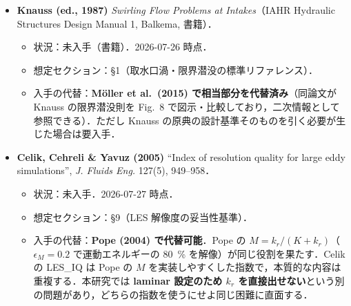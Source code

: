 \documentclass[11pt]{jsarticle}
\begin{document}
\begin{itemize}
\begin{itemize}
    \item \textbf{残る穴（2026-07-26 に一部解消）}：\texttt{discussion.tex} の看板主張のうち「理想シンクは渦度供給源をもたない」の部分は Imberger et al.\ (1976) で引けるようになった（§1，浮力・分布シンクの極限としての言明）．\textbf{未解決なのは「実際の吸込み流が距離とともにどう減衰し，鉛直方向にどんな構造をもつか」}の側で，49 本にこれを扱う文献がない（M\"uller の「吸込みは局所的」は深い系の話で，本論文が対比の相手にしているため支えにならない）．
    \item 入手の代替：大学図書館の電子書籍/OPAC．噴流側は Dracos (1992)・Giger (1991) で代替できるが\textbf{吸込み側の減衰構造の代替は現時点でない}．なお Imberger (1980) ``Selective withdrawal: a review'' は\textbf{成層取水の枠組みなので均質流体の本研究には届かない}（Imberger et al.\ 1976 のメモ参照）．主張(a)を厚くするだけなら流体力学の教科書（Batchelor, Lamb 等）のポテンシャルシンクで足りる．
  \end{itemize}
  \item \textbf{Knauss (ed., 1987)} \textit{Swirling Flow Problems at Intakes}（IAHR Hydraulic Structures Design Manual 1, Balkema, 書籍）．
  \begin{itemize}
    \item 状況：未入手（書籍）．2026-07-26 時点．
    \item 想定セクション：§1（取水口渦・限界潜没の標準リファレンス）．
    \item 入手の代替：\textbf{M\"oller et al.\ (2015) で相当部分を代替済み}（同論文が Knauss の限界潜没則を Fig.~8 で図示・比較しており，二次情報として参照できる）．ただし Knauss の原典の設計基準そのものを引く必要が生じた場合は要入手．
  \end{itemize}
  \item \textbf{Celik, Cehreli \& Yavuz (2005)} ``Index of resolution quality for large eddy simulations'', \textit{J. Fluids Eng.} 127(5), 949--958．
  \begin{itemize}
    \item 状況：未入手．2026-07-27 時点．
    \item 想定セクション：§9（LES 解像度の妥当性基準）．
    \item 入手の代替：\textbf{Pope (2004) で代替可能}．Pope の $M = k_r/(K+k_r)$（$\epsilon_M = 0.2$ で運動エネルギーの 80~\% を解像）が同じ役割を果たす．Celik の LES\_IQ は Pope の $M$ を実装しやすくした指数で，本質的な内容は重複する．本研究では \textbf{laminar 設定のため $k_r$ を直接出せない}という別の問題があり，どちらの指数を使うにせよ同じ困難に直面する．
  \end{itemize}

\end{itemize}
\end{document}

